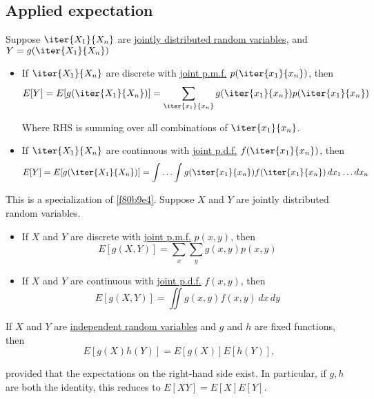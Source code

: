 \subsection{Applied expectation}\label{c7b30a3}

\label{f80b9e4}

Suppose $\iter{X_1}{X_n}$ are \href{ab5a852}{jointly distributed random
variables}, and $Y=g(\iter{X_1}{X_n})$
\begin{itemize}
  \item If $\iter{X_1}{X_n}$ are discrete with \href{e00d4ea}{joint p.m.f.}
        $p(\iter{x_1}{x_n})$, then
        $$
          E[Y]=E[g(\iter{X_1}{X_n})]=\sum_{\iter{x_1}{x_n}}g(\iter{x_1}{x_n})p(\iter{x_1}{x_n})
        $$

        Where RHS is summing over all combinations of $\iter{x_1}{x_n}$.
  \item If $\iter{X_1}{X_n}$ are continuous with \href{b62ce9b}{joint p.d.f.}
        $f(\iter{x_1}{x_n})$, then
        $$
          E[Y]=E[g(\iter{X_1}{X_n})]=\int\ldots\int g(\iter{x_1}{x_n})f(\iter{x_1}{x_n})\,dx_1\ldots dx_n
        $$
\end{itemize}

\label{aad7054}

This is a specialization of \autoref{f80b9e4}. Suppose $X$ and $Y$ are jointly
distributed random variables.
\begin{itemize}
  \item If $X$ and $Y$ are discrete with \href{e00d4ea}{joint p.m.f.} $p(x,y)$,
        then
        $$
          E[g(X,Y)]=\sum_x\sum_yg(x,y)p(x,y)
        $$
  \item If $X$ and $Y$ are continuous with \href{b62ce9b}{joint p.d.f.}
        $f(x,y)$, then
        $$
          E[g(X,Y)]=\iint g(x,y)f(x,y)\,dx\,dy
        $$
\end{itemize}

\label{b284980}

If $X$ and $Y$ are \href{f0da4c0}{independent random variables} and $g$ and $h$
are fixed functions, then
$$
  E[g(X)h(Y)]=E[g(X)]E[h(Y)],
$$

provided that the expectations on the right-hand side exist. In particular, if
$g,h$ are both the identity, this reduces to $E[XY]=E[X]E[Y]$.

\label{ba000ee}

